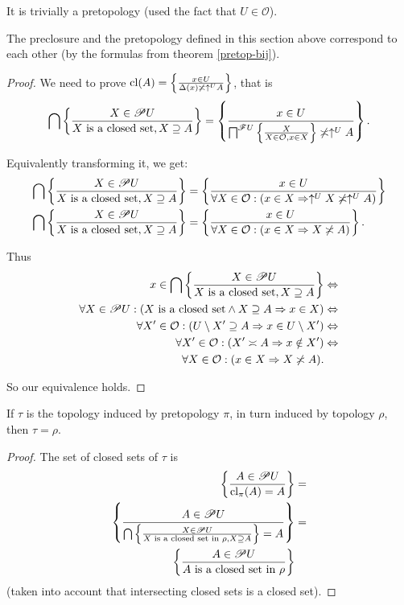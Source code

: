 It is trivially a pretopology (used the fact that $U\in\mathcal{O}$).
\begin{prop}
The preclosure and the pretopology defined in this section above correspond
to each other (by the formulas from theorem \ref{pretop-bij}).\end{prop}
\begin{proof}
We need to prove $\operatorname{cl}(A)=\left\{ \frac{x\in U}{\Delta(x)\not\asymp\uparrow^{U}A}\right\}$,
that is
\[
\bigcap\left\{ \frac{X\in\mathscr{P} U}{X\text{ is a closed set},X\supseteq A}\right\}=\left\{ \frac{x\in U}{\bigsqcap^{\mathscr{F}U}\left\{ \frac{X}{X\in\mathcal{O},x\in X}\right\}\not\asymp\uparrow^{U}A}\right\}.
\]


Equivalently transforming it, we get:
\begin{align*}
\bigcap\left\{ \frac{X\in\mathscr{P} U}{X\text{ is a closed set},X\supseteq A}\right\} & =\left\{ \frac{x\in U}{\forall X\in\mathcal{O}:(x\in X\Rightarrow\uparrow^{U}X\not\asymp\uparrow^{U}A)}\right\}\\
\bigcap\left\{ \frac{X\in\mathscr{P} U}{X\text{ is a closed set},X\supseteq A}\right\} & =\left\{ \frac{x\in U}{\forall X\in\mathcal{O}:(x\in X\Rightarrow X\not\asymp A)}\right\}.
\end{align*}


Thus
\begin{align*}
x\in\bigcap\left\{ \frac{X\in\mathscr{P} U}{X\text{ is a closed set},X\supseteq A}\right\} & \Leftrightarrow\\
\forall X\in\mathscr{P} U:(X\text{ is a closed set}\land X\supseteq A\Rightarrow x\in X) & \Leftrightarrow\\
\forall X'\in\mathcal{O}:(U\setminus X'\supseteq A\Rightarrow x\in U\setminus X') & \Leftrightarrow\\
\forall X'\in\mathcal{O}:(X'\asymp A\Rightarrow x\notin X') & \Leftrightarrow\\
\forall X\in\mathcal{O}:(x\in X\Rightarrow X\not\asymp A).
\end{align*}


So our equivalence holds.\end{proof}
\begin{prop}
If $\tau$ is the topology induced by pretopology $\pi$, in turn
induced by topology $\rho$, then $\tau=\rho$.\end{prop}
\begin{proof}
The set of closed sets of $\tau$ is
\begin{align*}
\left\{ \frac{A\in\mathscr{P} U}{\operatorname{cl}_{\pi}(A)=A}\right\} & =\\
\left\{ \frac{A\in\mathscr{P} U}{\bigcap\left\{ \frac{X\in\mathscr{P} U}{X\text{ is a closed set in }\rho,X\supseteq A}\right\}=A}\right\} & =\\
\left\{ \frac{A\in\mathscr{P} U}{A\text{ is a closed set in }\rho}\right\}
\end{align*}
(taken into account that intersecting closed sets is a closed set).\end{proof}
